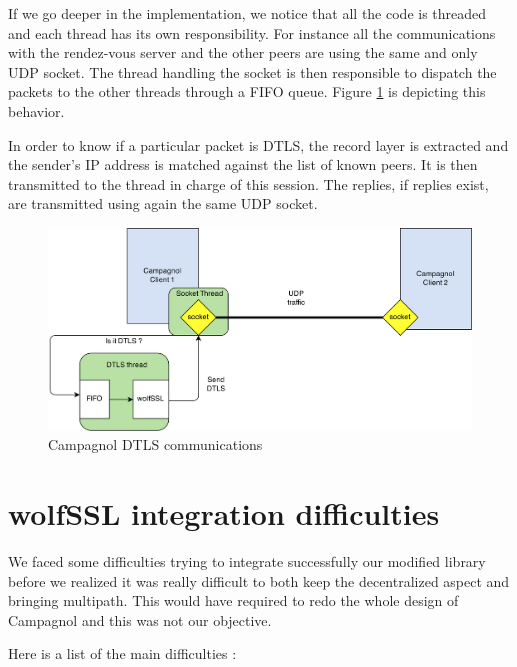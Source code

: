 If we go deeper in the implementation, we notice that all the code is threaded and each thread has its own responsibility. For instance all the communications with the rendez-vous server and the other peers are using the same and only UDP socket. The thread handling the socket is then responsible to dispatch the packets to the other threads through a FIFO queue. Figure \ref{fig:campagnol-dtls} is depicting this behavior.

In order to know if a particular packet is DTLS, the record layer is extracted and the sender's IP address is matched against the list of known peers. It is then transmitted to the thread in charge of this session. The replies, if replies exist, are transmitted using again the same UDP socket.

\begin{figure}[!ht]
\centering
\includegraphics[width=\textwidth]{images/campagnol-overview.eps}
\caption{Campagnol DTLS communications}
\label{fig:campagnol-dtls}
\end{figure}


\section{wolfSSL integration difficulties}


We faced some difficulties trying to integrate successfully our modified library before we realized it was really difficult to both keep the decentralized aspect and bringing multipath. This would have required to redo the whole design of Campagnol and this was not our objective.

Here is a list of the main difficulties :

